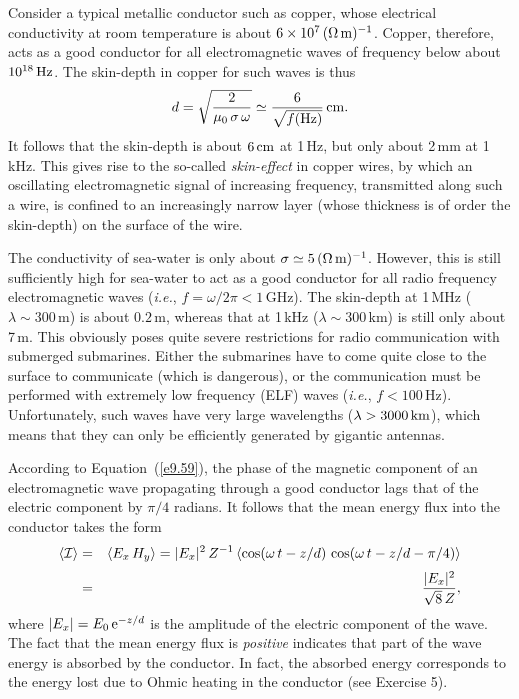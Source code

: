 Consider a typical metallic conductor such as copper, whose electrical
conductivity at room temperature  is about $6\times
10^{7}\,(\Omega\,{\rm m})^{-1}$. Copper, therefore, acts as a good
conductor for all electromagnetic waves of frequency below about
$10^{18}\,{\rm Hz}$. The skin-depth in copper for such waves is thus
\begin{equation}
d = \sqrt{\frac{2}{\mu_0\,\sigma\,\omega}} \simeq \frac{6}{\sqrt{f({\rm Hz})}}\,{\rm cm}.
\end{equation}
It follows that the skin-depth is about $6\,{\rm cm}$ at 1\,Hz, but only about
2\,mm at 1\,kHz. This gives rise to the so-called {\em skin-effect}\/ in copper wires, by which an oscillating electromagnetic
signal of increasing frequency, transmitted along such a wire,  is confined
to an increasingly narrow layer (whose thickness is of order the skin-depth)
on the surface of the wire.

The conductivity of sea-water is only about $\sigma\simeq 5\,(\Omega\,{\rm m})^{-1}$. However, this is still sufficiently high for sea-water to act as
a good conductor for all radio frequency electromagnetic waves ({\em i.e.}, $f=\omega/2\pi < 1$\,GHz). The skin-depth at 1\,MHz ($\lambda\sim 300$\,m)
is about $0.2$\,m, whereas that at 1\,kHz ($\lambda\sim 300$\,km)
is still only about 7\,m. This obviously poses quite severe restrictions for
radio communication with submerged submarines. Either the submarines
have to come quite close to the surface to communicate (which is dangerous), or the communication must be performed with extremely low frequency (ELF) waves ({\em i.e.}, $f< 100$\,Hz). Unfortunately, such waves have very large wavelengths ($\lambda > 3000\,{\rm km}$), which means
that they can only be efficiently generated by gigantic
antennas. 

According to Equation~(\ref{e9.59}), the phase of the magnetic component of an
electromagnetic wave propagating through a good conductor lags that of the
electric component by $\pi/4$ radians. It follows that the mean energy flux into
the conductor takes the form
\begin{eqnarray}
\langle{\cal I}\rangle &=& \langle E_x\,H_y\rangle = |E_x|^2\,Z^{-1}\,\langle \cos(\omega\,t-z/d)\,\cos(\omega\,t-z/d-\pi/4)\rangle \nonumber\\[0.5ex] &=& \frac{|E_x|^2}{\sqrt{8}\,Z},
\end{eqnarray}
where $|E_x| = E_0\,{\rm e}^{-z/d}$ is the amplitude of the electric component of the
wave. The fact that the mean energy flux is {\em positive}\/ indicates that part of the
wave energy is absorbed by the conductor. In fact, the absorbed energy corresponds
to the energy lost due to Ohmic heating in the conductor (see Exercise 5).

